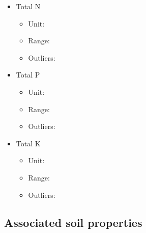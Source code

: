 \documentclass[
  10pt,
  b5paper,
  oneside]{book}
\providecommand{\tightlist}{%
  \setlength{\itemsep}{0pt}\setlength{\parskip}{0pt}}
\begin{document}
\begin{itemize}
\tightlist
\item
  Total N

  \begin{itemize}
  \tightlist
  \item
    Unit:
  \item
    Range:
  \item
    Outliers:
  \end{itemize}
\item
  Total P

  \begin{itemize}
  \tightlist
  \item
    Unit:
  \item
    Range:
  \item
    Outliers:
  \end{itemize}
\item
  Total K

  \begin{itemize}
  \tightlist
  \item
    Unit:
  \item
    Range:
  \item
    Outliers:
  \end{itemize}
\end{itemize}

\hypertarget{associated-soil-properties}{%
\subsection*{Associated soil properties}\label{associated-soil-properties}}
\end{document}
